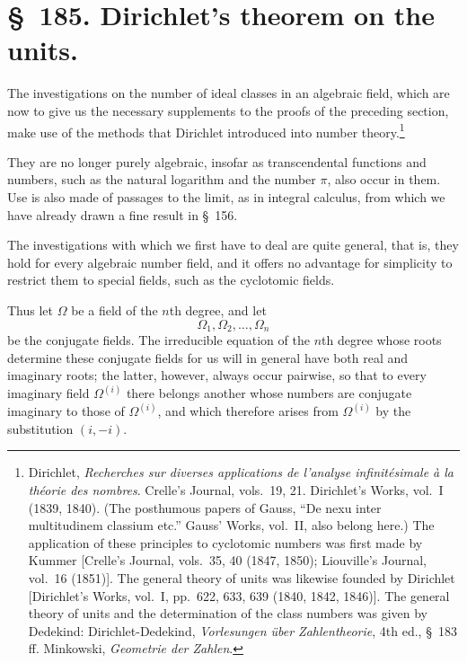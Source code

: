 \documentclass[11pt]{article}
\begin{document}
\section*{\S~185. Dirichlet's theorem on the units.}

The investigations on the number of ideal classes in an algebraic field, which are now to give us the necessary supplements to the proofs of the preceding section, make use of the methods that Dirichlet introduced into number theory.\footnote{Dirichlet, \textit{Recherches sur diverses applications de l'analyse infinitésimale à la théorie des nombres}. Crelle's Journal, vols.~19, 21. Dirichlet's Works, vol.~I (1839, 1840). (The posthumous papers of Gauss, ``De nexu inter multitudinem classium etc.'' Gauss' Works, vol.~II, also belong here.) The application of these principles to cyclotomic numbers was first made by Kummer [Crelle's Journal, vols.~35, 40 (1847, 1850); Liouville's Journal, vol.~16 (1851)]. The general theory of units was likewise founded by Dirichlet [Dirichlet's Works, vol.~I, pp.~622, 633, 639 (1840, 1842, 1846)]. The general theory of units and the determination of the class numbers was given by Dedekind: Dirichlet-Dedekind, \textit{Vorlesungen über Zahlentheorie}, 4th ed., \S~183 ff. Minkowski, \textit{Geometrie der Zahlen}.}

They are no longer purely algebraic, insofar as transcendental functions and numbers, such as the natural logarithm and the number $\pi$, also occur in them. Use is also made of passages to the limit, as in integral calculus, from which we have already drawn a fine result in \S~156.

The investigations with which we first have to deal are quite general, that is, they hold for every algebraic number field, and it offers no advantage for simplicity to restrict them to special fields, such as the cyclotomic fields.

Thus let $\Omega$ be a field of the $n$th degree, and let
\begin{equation}
\Omega_1,\Omega_2,\ldots,\Omega_n
\tag{1}
\end{equation}
be the conjugate fields. The irreducible equation of the $n$th degree whose roots determine these conjugate fields for us will in general have both real and imaginary roots; the latter, however, always occur pairwise, so that to every imaginary field $\Omega^{(i)}$ there belongs another whose numbers are conjugate imaginary to those of $\Omega^{(i)}$, and which therefore arises from $\Omega^{(i)}$ by the substitution $(i,-i)$.
\end{document}
